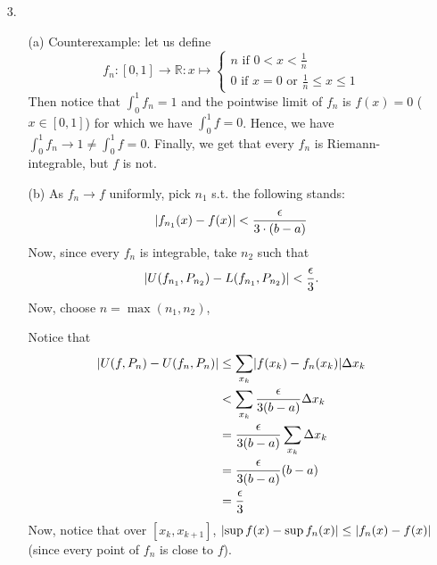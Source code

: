 \documentclass[11pt]{article}
\DeclarePairedDelimiter\abs{\lvert}{\rvert}%
\newcommand{\reals}{\mathbb{R}}
\begin{document}
\begin{itemize}
    \item[3.]
        \begin{itemize}
            \item[(a)]
                Counterexample: let us define
                \begin{equation*}
                    f_n : [0, 1] \to \reals : x \mapsto
                    \begin{cases}
                        n \text{ if } 0 < x < \frac{1}{n}\\
                        0 \text{ if $x = 0$ or $\frac{1}{n} \leq x \leq 1$}
                    \end{cases}
                \end{equation*}
                Then notice that $\int_0^1 f_n = 1$ and the pointwise limit of
                $f_n$ is $f(x) = 0$ ($x \in [0, 1]$) for which we have
                $\int_0^1 f = 0$. Hence, we have $\int_0^1 f_n \to 1 \neq
                \int_0^1 f = 0$. Finally, we get that every $f_n$ is
                Riemann-integrable, but $f$ is not.

            \item[(b)]
                As $f_n \to f$ uniformly, pick $n_1$ s.t. the following stands:
                \begin{equation*}
                  \abs{f_{n_1}(x) - f(x)} < \frac{\epsilon}{3\cdot(b-a)}
                \end{equation*}
                Now, since every $f_n$ is integrable, take $n_2$ such that
                \begin{equation*}
                  \abs{U(f_{n_1}, P_{n_2}) - L(f_{n_1}, P_{n_2})} <
                        \frac{\epsilon}{3}.
                \end{equation*}
                Now, choose $n = \max(n_1, n_2)$,

                Notice that 
                \begin{align*}
                    \abs{
                        U(f, P_{n}) - U(f_n, P_{n})
                    } 
                    &\leq \sum_{x_k} \abs{f(x_k) - f_n(x_k)} \Delta x_k\\
                    &< \sum_{x_k} \frac{\epsilon}{3(b-a)} \Delta x_k\\
                    &= \frac{\epsilon}{3(b-a)} \sum_{x_k} \Delta x_k\\
                    &= \frac{\epsilon}{3(b-a)} (b-a)\\
                    &= \frac{\epsilon}{3}
                \end{align*}
                Now, notice that over $[x_k, x_{k+1}]$, $\abs{\sup f(x) - \sup
                f_n(x)} \leq \abs{f_{n}(x) - f(x)}$ (since every point of $f_n$
                is close to $f$).


\end{itemize}
\end{itemize}
\end{document}
